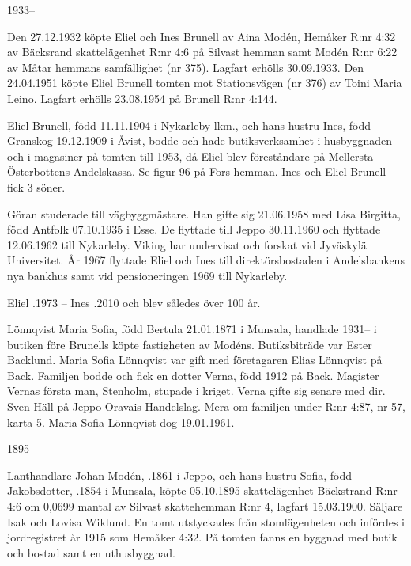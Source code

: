  1933--

Den 27.12.1932 köpte Eliel och Ines Brunell av Aina Modén, Hemåker R:nr 4:32 av Bäcksrand skattelägenhet R:nr 4:6 på Silvast hemman samt Modén R:nr 6:22 av Måtar hemmans samfällighet (nr 375). Lagfart erhölls 30.09.1933. Den 24.04.1951 köpte Eliel Brunell tomten mot Stationsvägen (nr 376) av Toini Maria Leino. Lagfart erhölls 23.08.1954 på Brunell R:nr 4:144.

Eliel Brunell, född 11.11.1904 i Nykarleby lkm., och hans hustru Ines, född Granskog 19.12.1909 i Åvist, bodde och hade butiksverksamhet i husbyggnaden och i magasiner på tomten till 1953, då Eliel blev föreståndare på Mellersta Österbottens Andelskassa. Se figur 96 på Fors hemman. Ines och Eliel Brunell fick 3 söner.
\begin{jhchildren}
  \item {}
  \item {}
  \item {}
\end{jhchildren}
Göran studerade till vägbyggmästare. Han gifte sig 21.06.1958 med Lisa Birgitta, född Antfolk 07.10.1935 i Esse. De flyttade till Jeppo 30.11.1960 och flyttade 12.06.1962 till Nykarleby. Viking har undervisat och forskat vid Jyväskylä Universitet. År 1967 flyttade Eliel och Ines till direktörsbostaden i Andelsbankens nya bankhus samt vid pensioneringen 1969 till Nykarleby.

Eliel .1973  -- Ines .2010 och blev således över 100 år.

Lönnqvist Maria Sofia, född Bertula 21.01.1871 i Munsala, handlade 1931-- i butiken före Brunells köpte fastigheten av Modéns. Butiksbiträde var Ester Backlund. Maria Sofia Lönnqvist var gift med företagaren Elias Lönnqvist på Back. Familjen bodde och fick en dotter Verna, född 1912 på Back. Magister Vernas första man, Stenholm, stupade i kriget. Verna gifte sig senare med dir. Sven Häll på Jeppo-Oravais Handelslag. Mera om familjen under R:nr 4:87, nr 57, karta 5. Maria Sofia Lönnqvist dog 19.01.1961.


 1895--

Lanthandlare Johan Modén, .1861 i Jeppo, och hans hustru Sofia, född Jakobsdotter, .1854 i Munsala, köpte 05.10.1895 skattelägenhet Bäckstrand R:nr 4:6 om 0,0699 mantal av Silvast skattehemman R:nr 4, lagfart 15.03.1900. Säljare Isak och Lovisa Wiklund. En tomt utstyckades från stomlägenheten och infördes i jordregistret år 1915 som Hemåker 4:32. På tomten fanns en byggnad med butik och bostad samt en uthusbyggnad.

